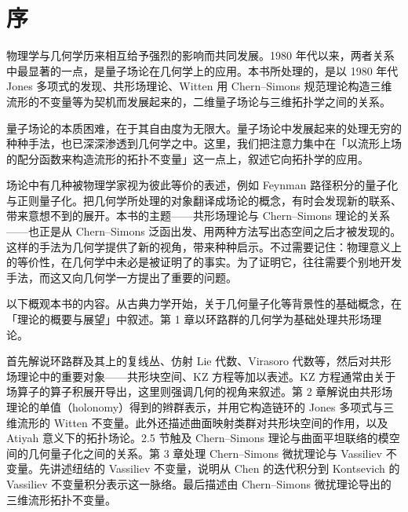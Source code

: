 
\chapter*{序}

物理学与几何学历来相互给予强烈的影响而共同发展。1980 年代以来，两者关系中最显著的一点，是量子场论在几何学上的应用。本书所处理的，是以 1980 年代 Jones 多项式的发现、共形场理论、Witten 用 Chern--Simons 规范理论构造三维流形的不变量等为契机而发展起来的，二维量子场论与三维拓扑学之间的关系。

量子场论的本质困难，在于其自由度为无限大。量子场论中发展起来的处理无穷的种种手法，也已深深渗透到几何学之中。这里，我们把注意力集中在「以流形上场的配分函数来构造流形的拓扑不变量」这一点上，叙述它向拓扑学的应用。

场论中有几种被物理学家视为彼此等价的表述，例如 Feynman 路径积分的量子化与正则量子化。把几何学所处理的对象翻译成场论的概念，有时会发现新的联系、带来意想不到的展开。本书的主题------共形场理论与 Chern--Simons 理论的关系------也正是从 Chern--Simons 泛函出发、用两种方法写出态空间之后才被发现的。这样的手法为几何学提供了新的视角，带来种种启示。不过需要记住：物理意义上的等价性，在几何学中未必是被证明了的事实。为了证明它，往往需要个别地开发手法，而这又向几何学一方提出了重要的问题。

以下概观本书的内容。从古典力学开始，关于几何量子化等背景性的基础概念，在「理论的概要与展望」中叙述。第 1 章以环路群的几何学为基础处理共形场理论。

首先解说环路群及其上的复线丛、仿射 Lie 代数、Virasoro 代数等，然后对共形场理论中的重要对象------共形块空间、KZ 方程等加以表述。KZ 方程通常由关于场算子的算子积展开导出，这里则强调几何的视角来叙述。第 2 章解说由共形场理论的单值（holonomy）得到的辫群表示，并用它构造链环的 Jones 多项式与三维流形的 Witten 不变量。此外还描述曲面映射类群对共形块空间的作用，以及 Atiyah 意义下的拓扑场论。2.5 节触及 Chern--Simons 理论与曲面平坦联络的模空间的几何量子化之间的关系。第 3 章处理 Chern--Simons 微扰理论与 Vassiliev 不变量。先讲述纽结的 Vassiliev 不变量，说明从 Chen 的迭代积分到 Kontsevich 的 Vassiliev 不变量积分表示这一脉络。最后描述由 Chern--Simons 微扰理论导出的三维流形拓扑不变量。

